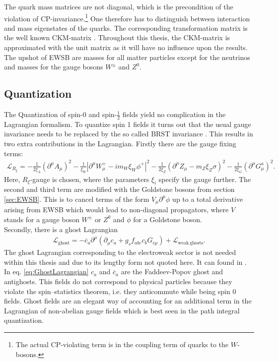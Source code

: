 The quark mass matrices are not diagonal, which is the precondition of the violation of CP-invariance.\footnote{The actual CP-violating term is in the coupling term of quarks to the $W$-bosons.} One therefore has to distinguish between interaction and mass eigenstates of the quarks. The corresponding transformation matrix is the well known CKM-matrix \cite{Cabbibo:1964zsa, Kobayashi:1973fv}. Throughout this thesis, the CKM-matrix is approximated with the unit matrix as it will have no influence upon the results.\\
The upshot of EWSB are masses for all matter particles except for the neutrinos and masses for the gauge bosons $W^\pm$ and $Z^0$.

\subsection{Quantization}
The Quantization of spin-0 and spin-$\frac{1}{2}$ fields yield no complication in the Lagrangian formalism. To quantize spin 1 fields it turns out that the usual gauge invariance needs to be replaced by the so called BRST invariance \cite{Becchi:1974xu, Becchi:1974md, Becchi:1975nq}. This results in two extra contributions in the Lagrangian. Firstly there are the gauge fixing terms:
\begin{align}
\mathcal{L}_{R_\xi} = -\frac{1}{2\xi_A} (\partial^\mu A_\mu)^2  - \frac{1}{\xi_W} |\partial^\mu W_\mu^+ - im_W \xi_W \phi^+|^2 - \frac{1}{2\xi_Z} (\partial^\mu Z_\mu - m_Z \xi_Z \sigma)^2 - \frac{1}{2\xi_G}(\partial^\mu G_\mu^a)^2.
\end{align}
Here, $R_\xi$-gauge is chosen, where the parameters $\xi_i$ specify the gauge further. The second and third term are modified with the Goldstone bosons from section \ref{sec:EWSB}. This is to cancel terms of the form $V_\mu \partial^\mu \phi$ up to a total derivative arising from EWSB which would lead to non-diagonal propagators, where $V$ stands for a gauge boson $W^\pm$ or $Z^0$ and $\phi$ for a Goldstone boson.\\%
Secondly, there is a ghost Lagrangian
\begin{align}
\mathcal{L}_{\mathrm{ghost}} = -\overline{c}_a \partial^\mu \left( \partial_\mu c_a + g_s f_{abc} c_b G_{c \mu} \right) + \mathcal{L}_{\mathrm{weak\ ghosts}}.\label{eq:GhostLagrangian}
\end{align}
The ghost Lagrangian corresponding to the electroweak sector is not needed within this thesis and due to its lengthy form not quoted here. It can found in \cite{book:811554}. %
In eq. \ref{eq:GhostLagrangian} $c_a$ and $\overline{c}_a$ are the Faddeev-Popov ghost and antighosts. This fields do not correspond to physical particles because they violate the spin–statistics theorem, i.e. they anticommute while being spin 0 fields. Ghost fields are an elegant way of accounting for an additional term in the Lagrangian of non-abelian gauge fields which is best seen in the path integral quantization\cite{Peskin}.

